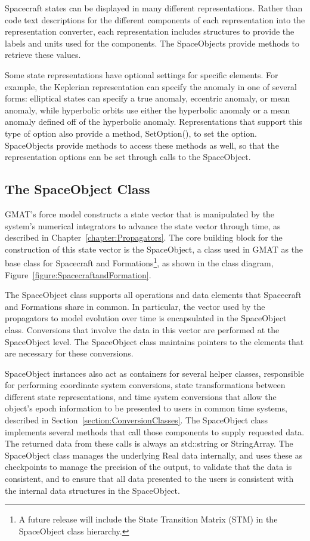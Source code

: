 Spacecraft states can be displayed in many different representations.  Rather than code text
descriptions for the different components of each representation into the representation converter,
each representation includes structures to provide the labels and units used for the components.
The SpaceObjects provide methods to retrieve these values.

Some state representations have optional settings for specific elements.  For example, the Keplerian
representation can specify the anomaly in one of several forms: elliptical states can specify a true
anomaly, eccentric anomaly, or mean anomaly, while hyperbolic orbits use either the hyperbolic
anomaly or a mean anomaly defined off of the hyperbolic anomaly.  Representations that support this
type of option also provide a method, SetOption(), to set the option.  SpaceObjects provide methods
to access these methods as well, so that the representation options can be set through calls to the
SpaceObject.

\subsection{The SpaceObject Class}

GMAT's force model constructs a state vector that is manipulated by the system's numerical
integrators to advance the state vector through time, as described in
Chapter~\ref{chapter:Propagators}.  The core building block for the construction of this state
vector is the SpaceObject, a class used in GMAT as the base class for Spacecraft and
Formations\footnote{A future release will include the State Transition Matrix (STM) in the
SpaceObject class hierarchy.}, as shown in the class diagram,
Figure~\ref{figure:SpacecraftandFormation}.

The SpaceObject class supports all operations and data elements that Spacecraft and Formations share
in common.  In particular, the vector used by the propagators to model evolution over time is
encapsulated in the SpaceObject class.  Conversions that involve the data in this vector are
performed at the SpaceObject level.  The SpaceObject class maintains pointers to the elements that
are necessary for these conversions.

SpaceObject instances also act as containers for several helper classes, responsible for performing
coordinate system conversions, state transformations between different state representations, and
time system conversions that allow the object's epoch information to be presented to users in common
time systems, described in Section~\ref{section:ConversionClasses}. The SpaceObject class implements
several methods that call those components to supply requested data.  The returned data from these
calls is always an std::string or StringArray.  The SpaceObject class manages the underlying Real
data internally, and uses these as checkpoints to manage the precision of the output, to validate
that the data is consistent, and to ensure that all data presented to the users is consistent with
the internal data structures in the SpaceObject.

